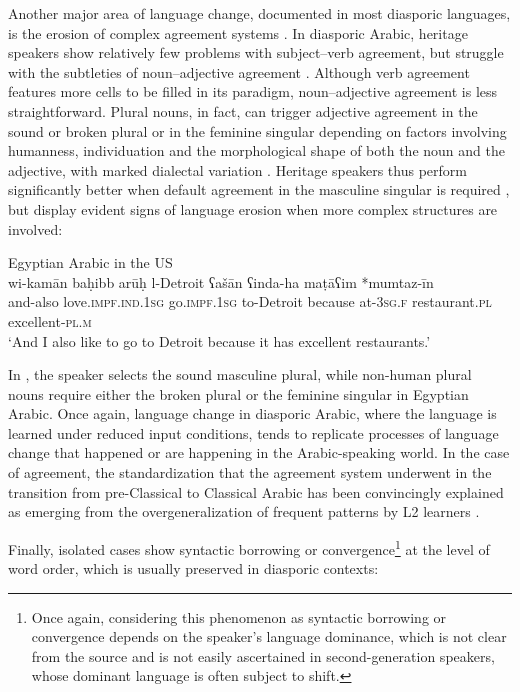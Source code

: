 \documentclass[output=paper]{langsci/langscibook}
\begin{document}
Another major area of language change, documented in most diasporic languages, is the erosion of complex agreement systems \citep[192]{GonzoSaltarelli1983}. In diasporic Arabic, heritage speakers show relatively few problems with subject–verb agreement, but struggle with the subtleties of noun–adjective agreement \citep[8]{AlbiriniChakrani2013}. Although verb agreement features more cells to be filled in its paradigm, noun–adjective agreement is less straightforward. Plural nouns, in fact, can trigger adjective agreement in the sound or broken plural or in the feminine singular depending on factors involving humanness, individuation and the morphological shape of both the noun and the adjective, with marked dialectal variation \citep[103–104]{Danna2017article}. Heritage speakers thus perform significantly better when default agreement in the masculine singular is required \citep[8]{AlbiriniChakrani2013}, but display evident signs of language erosion when more complex structures are involved: 

\ea\label{ex:key:usa}
{Egyptian Arabic in the US \citep[740]{Albirini2014}}\\
\gll wi-kamān baḥibb arūḥ l-Detroit ʕašān ʕinda-ha maṭāʕim *mumtaz-īn\\
     and-also love.\textsc{impf.ind.1sg} go.\textsc{impf.1sg} to-Detroit because at-\textsc{3sg.f} restaurant.\textsc{pl} excellent-\textsc{pl.m}\\
\glt `And I also like to go to Detroit because it has excellent restaurants.'
\z

In , the speaker selects the sound masculine plural, while non-human plural nouns require either the broken plural or the feminine singular in Egyptian Arabic. Once again, language change in diasporic Arabic, where the language is learned under reduced input conditions, tends to replicate processes of language change that happened or are happening in the Arabic-speaking world. In the case of agreement, the standardization that the agreement system underwent in the transition from pre-Classical to Classical Arabic has been convincingly explained as emerging from the overgeneralization of frequent patterns by L2 learners \citep{Belnap1999}.

Finally, isolated cases show syntactic borrowing or convergence\footnote{Once again, considering this phenomenon as syntactic borrowing or convergence depends on the speaker’s language dominance, which is not clear from the source and is not easily ascertained in second-generation speakers, whose dominant language is often subject to shift.} at the level of word order, which is usually preserved in diasporic contexts:
\end{document}
